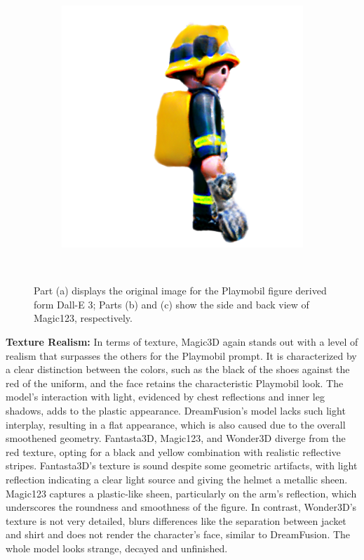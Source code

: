 \begin{figure}[ht]
\begin{subfigure}[b]{0.25\textwidth}
        \caption{}
    \end{subfigure}
    \begin{subfigure}[b]{0.25\textwidth}
        \centering
        \includegraphics[width=\textwidth]{etc/a high quality rendering of a playmobil firefighter/magic123/magic123_playmobil_coarse_right_10000_part1.png}
        \caption{}
    \end{subfigure}
    \caption{Part (a) displays the original image for the Playmobil figure derived form Dall-E 3; Parts (b) and (c) show the side and back view of Magic123, respectively.}~\label{fig:inputPlaymobil}
\end{figure}

\textbf{Texture Realism:} In terms of texture, Magic3D again stands out with a level of realism that surpasses the others for the Playmobil prompt. It is characterized by a clear distinction between the colors, such as the black of the shoes against the red of the uniform, and the face retains the characteristic Playmobil look. The model's interaction with light, evidenced by chest reflections and inner leg shadows, adds to the plastic appearance. DreamFusion's model lacks such light interplay, resulting in a flat appearance, which is also caused due to the overall smoothened geometry. Fantasta3D, Magic123, and Wonder3D diverge from the red texture, opting for a black and yellow combination with realistic reflective stripes. Fantasta3D's texture is sound despite some geometric artifacts, with light reflection indicating a clear light source and giving the helmet a metallic sheen. Magic123 captures a plastic-like sheen, particularly on the arm's reflection, which underscores the roundness and smoothness of the figure. In contrast, Wonder3D's texture is not very detailed, blurs differences like the separation between jacket and shirt and does not render the character's face, similar to DreamFusion. The whole model looks strange, decayed and unfinished.

